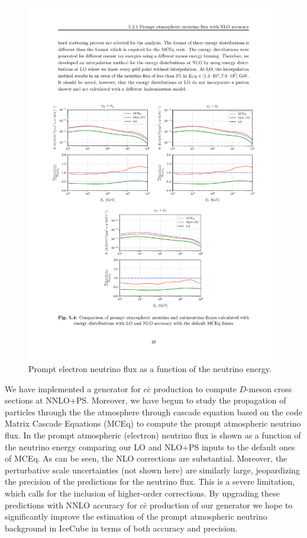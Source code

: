 \documentclass{FBR_Bericht_2025}
\begin{document}
\begin{refsection}
\begin{figure}[bt]
\begin{center}
\includegraphics[width=0.95\linewidth]{plots/cc_neutrino_flux.pdf}
\caption{Prompt electron neutrino flux as a function of the neutrino energy.}
\label{fig:neutrinoflux}
\end{center}
\end{figure}

We have implemented a \minnlo{} generator for $c\bar c$ production to compute
$D$-meson cross sections at NNLO+PS. Moreover, we have begun to study 
the propagation of particles through the the atmosphere through cascade equation
based on the code Matrix Cascade Equations (MCEq) \cite{Fedynitch:2015zbe} to compute the prompt
atmospheric neutrino flux. In  the prompt atmospheric (electron) neutrino
flux is shown as a function of the neutrino energy comparing our LO and NLO+PS
inputs to the default ones of MCEq. As can be seen, the NLO corrections are substantial.
Moreover, the perturbative scale uncertainties (not shown here) are similarly large, 
jeopardizing the precision of the predictions for the neutrino flux. 
This is a severe limitation, which calls for the inclusion of higher-order corrections.
By upgrading these predictions with NNLO accuracy for $c\bar c$ production of 
our \minnlo{} generator we hope to significantly improve the estimation of the 
prompt atmospheric neutrino background in IceCube in terms of both accuracy and
precision.



\end{refsection}
\end{document}

